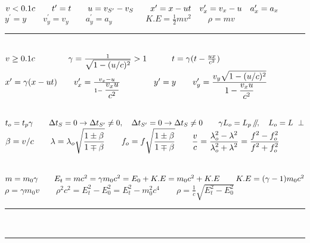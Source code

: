 \documentclass[a4paper,12pt]{article}
\newcommand{\slparallel}{\mathbin{\!/\mkern-5mu/\!}}
\begin{document}

\fontsize{14.5}{16}\selectfont

\noindent
$v < 0.1c \qquad t^\prime = t \qquad u = v_{S^\prime} - v_S \qquad x^\prime = x - ut \quad v^\prime_x = v_x - u \quad a_x^\prime = a_x \\[+2mm]$
$ y^\prime = y \qquad v^\prime_y = v_y \qquad a_y^\prime = a_y \qquad \qquad K.E = \frac{1}{2} mv^2 \qquad \rho = mv $

{\centering \rule{10cm}{0.4pt} \par}

\ \\
\noindent
$ v \ge 0.1c \qquad \qquad \gamma = \frac{1}{\displaystyle \sqrt{1- (u/c)^2}} > 1 \qquad \quad t = \gamma (t - \frac{ux}{c^2})\\$
$x^\prime = \gamma(x - ut) \qquad v^\prime_x = \frac{v_x - u}{1- \displaystyle \frac{v_x u}{c^2} } \qquad \qquad  y^\prime = y \qquad v^\prime_y = \displaystyle \frac{\displaystyle v_y \sqrt{1-(u/c)^2}}{\displaystyle 1- \frac{v_x u}{c^2}}\\[-3mm]$

{\centering \hdashrule{10cm}{0.4pt}{4pt} \par}

\ \\
\noindent
$ t_o = t_p \gamma \qquad \Delta t_S = 0 \rightarrow \Delta t_{S^\prime} \neq 0, \quad \Delta t_{S^\prime} = 0 \rightarrow \Delta t_S \neq 0 \qquad \gamma L_o = L_p \ \slparallel, \quad L_o = L \ \perp \\[+2mm]$
$ \beta = v/c \qquad \lambda = \lambda_o \displaystyle \sqrt{\frac{1\pm \beta}{1\mp \beta}} \qquad f_o = f \displaystyle \sqrt{\frac{1\pm \beta}{1\mp \beta}} \qquad \frac{v}{c} = \frac{\displaystyle \lambda_o^2 - \lambda^2}{\displaystyle \lambda_o^2 + \lambda^2} = \frac{\displaystyle f^2 - f_o^2}{\displaystyle f^2 + f_o^2} \\[-1mm]$

{\centering \hdashrule{10cm}{0.4pt}{4pt} \par}

\ \\
\noindent
$ m = m_0 \gamma \qquad E_t = mc^2 = \gamma m_0c^2 = E_0 + K.E = m_0c^2 + K.E \qquad K.E = (\gamma - 1) m_0c^2 \\[+2mm]$
$\rho = \gamma m_0v \qquad \rho^2c^2 = E_t^2 - E_0^2 = E_t^2 - m_0^2c^4 \qquad \rho = \frac{1}{c} \sqrt{E_t^2 - E_0^2}$

{\centering \rule{10cm}{0.8pt}\\\rule[\dimexpr \ht\strutbox+0.1cm]{7cm}{0.8pt} \par}
\end{document}

